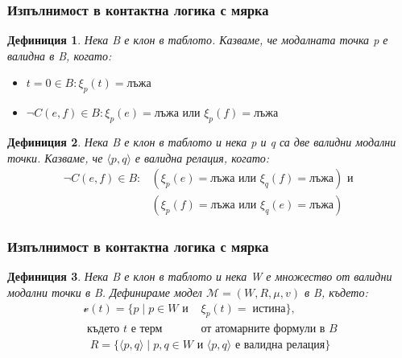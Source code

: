 \documentclass{beamer}
\newtheorem{defn}{Дефиниция}[section]
\newcommand{\vE}{\mathscr{v}}
\newcommand{\vBool}{\xi}
\begin{document}
\begin{frame}\frametitle{Изпълнимост в контактна логика с мярка}
	\begin{defn}%
	Нека B е клон в таблото. Казваме, че модалната точка p е валидна в B, когато:
	\begin{itemize}
		\item $t = 0 \in B:  \vBool_{p}(t) = \textbf{лъжа}$
		\item $\neg C(e, f) \in B: \vBool_{p}(e) = \textbf{лъжа} \textit{ или } \vBool_{p}(f) = \textbf{лъжа}$
	\end{itemize}
	\end{defn}

	\begin{defn}
		Нека B е клон в таблото и нека p и q са две валидни модални точки. Казваме, че $\langle p, q \rangle$ е валидна релация, когато:
		\begin{align*}
				\neg C(e, f) \in B: &(\vBool_{p}(e) = \textbf{лъжа} \textit{ или } \vBool_{q}(f) = \textbf{лъжа}) \textit{ и } \\
				 &(\vBool_{p}(f) = \textbf{лъжа} \textit{ или } \vBool_{q}(e) = \textbf{лъжа})
		\end{align*}
	\end{defn}
\end{frame}

\begin{frame}\frametitle{Изпълнимост в контактна логика с мярка}
	\begin{defn}
Нека B е клон в таблото и нека W е множество от валидни модални точки в B. Дефинираме модел $\mathcal{M} = (W, R, \mu, v)$ в B, където:
		\begin{align*}
				\vE(t) = \{ p \; | \; p \in W \textit{ и } &\vBool_{p}(t) =\; \textit{истина} \}, \\
				\textit{ където t е терм } & \textit{от атомарните формули в B}
		\end{align*}
		\begin{align*}
				R = \{ \langle p, q \rangle\; | \; p, q \in W \textit{ и } \langle p, q \rangle \textit{ е валидна релация}\}
		\end{align*}
	\end{defn}
\end{frame}
\end{document}
